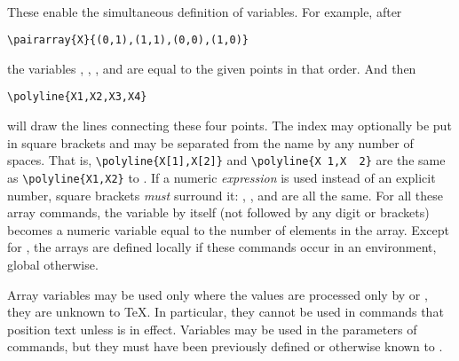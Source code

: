 \documentclass[letterpaper]{article}
\begin{document}
\begin{cd}
\\
\\
\\
\\
\\
\\
%
%
%
%
%
%
%
\end{cd}

These enable the simultaneous definition of variables.
For example, after
\begin{verbatim}
\pairarray{X}{(0,1),(1,1),(0,0),(1,0)}
\end{verbatim}
the variables , , , and  are equal to
the given points in that order. And then
\begin{verbatim}
\polyline{X1,X2,X3,X4}
\end{verbatim}
will draw the lines connecting these four points. The index may
optionally be put in square brackets and may be separated from the name
by any number of spaces. That is, \verb$\polyline{X[1],X[2]}$ and
\verb$\polyline{X 1,X  2}$ are the same as \verb$\polyline{X1,X2}$ to
\MF{}. If a numeric \emph{expression} is used instead of an explicit
number, square brackets \emph{must} surround it: ,
,  and  are all the same. For all these
array commands, the variable  by itself (not followed by any
digit or brackets) becomes a numeric variable equal to the number of
elements in the array. Except for , the arrays are
defined locally if these commands occur in an  environment,
global otherwise.

Array variables may be used only where the values are processed only by
\MF{} or \MP{}, they are unknown to \TeX{}. In particular, they cannot be
used in commands that position text unless  is in effect.
Variables may be used in the  parameters of commands,
but they must have been previously defined or otherwise known to \MF{}.
\end{document}
